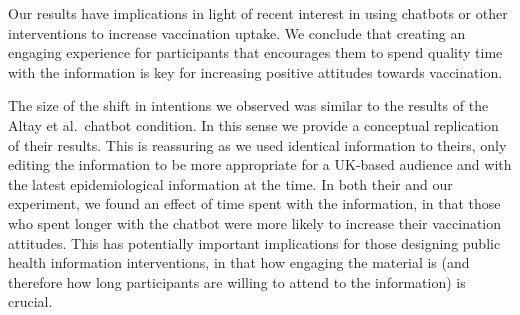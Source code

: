 \documentclass[
  english,
  ,jou,floatsintext]{apa6}
\begin{document}
Our results have implications in light of recent interest in using chatbots or other interventions to increase vaccination uptake. We conclude that creating an engaging experience for participants that encourages them to spend quality time with the information is key for increasing positive attitudes towards vaccination.

The size of the shift in intentions we observed was similar to the results of the Altay et al.~chatbot condition. In this sense we provide a conceptual replication of their results. This is reassuring as we used identical information to theirs, only editing the information to be more appropriate for a UK-based audience and with the latest epidemiological information at the time. In both their and our experiment, we found an effect of time spent with the information, in that those who spent longer with the chatbot were more likely to increase their vaccination attitudes. This has potentially important implications for those designing public health information interventions, in that how engaging the material is (and therefore how long participants are willing to attend to the information) is crucial.
\end{document}
